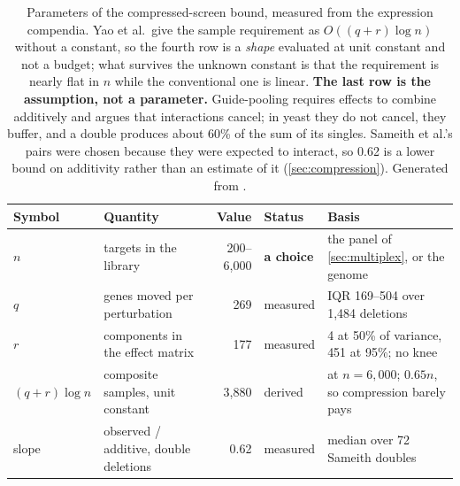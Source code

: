\begin{table}[htbp]\centering
\footnotesize
\caption[]{Parameters of the compressed-screen bound, measured from the expression compendia. Yao et al.\ give the sample requirement as $O((q+r)\log n)$ without a constant, so the fourth row is a \emph{shape} evaluated at unit constant and not a budget; what survives the unknown constant is that the requirement is nearly flat in $n$ while the conventional one is linear. \textbf{The last row is the assumption, not a parameter.} Guide-pooling requires effects to combine additively and argues that interactions cancel; in yeast they do not cancel, they buffer, and a double produces about 60\% of the sum of its singles. Sameith et al.'s pairs were chosen because they were expected to interact, so 0.62 is a lower bound on additivity rather than an estimate of it (\cref{sec:compression}). Generated from .}\label{tab:compression-params}
\begin{tabular}{llrll}
\toprule
Symbol & Quantity & Value & Status & Basis \\
\midrule
$n$ & targets in the library & 200--6{,}000 & \textbf{a choice} & the panel of \cref{sec:multiplex}, or the genome \\
$q$ & genes moved per perturbation & 269 & measured & IQR 169--504 over 1{,}484 deletions \\
$r$ & components in the effect matrix & 177 & measured & 4 at 50\% of variance, 451 at 95\%; no knee \\
$(q{+}r)\log n$ & composite samples, unit constant & 3{,}880 & derived & at $n=6{,}000$; $0.65n$, so compression barely pays \\
slope & observed / additive, double deletions & 0.62 & measured & median over 72 Sameith doubles \\
\bottomrule
\end{tabular}
\end{table}
